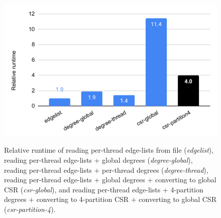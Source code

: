\begin{figure}[hbtp]
  \centering
  \includegraphics[width=0.99\linewidth]{out/optimize-csr.pdf} \\[-2ex]
  \caption{Relative runtime of reading per-thread edge-lists from file (\textit{edgelist}), reading per-thread edge-lists + global degrees (\textit{degree-global}), reading per-thread edge-lists + per-thread degrees (\textit{degree-thread}), reading per-thread edge-lists + global degrees + converting to global CSR (\textit{csr-global}), and reading per-thread edge-lists + 4-partition degrees + converting to 4-partition CSR + converting to global CSR (\textit{csr-partition-4}).}
  \label{fig:optimize-csr}
\end{figure}

